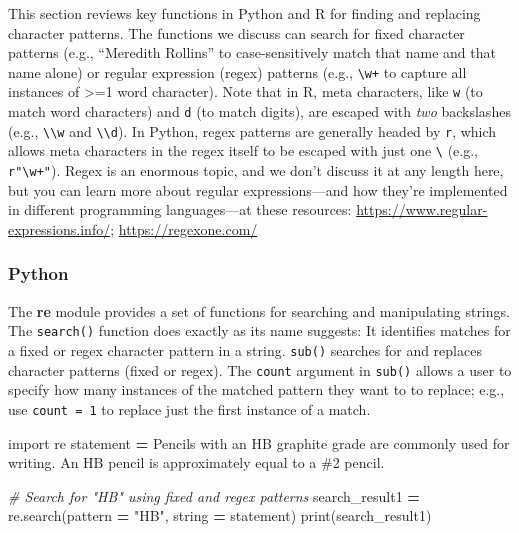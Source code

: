 \documentclass[
]{book}
\newenvironment{Shaded}{\begin{snugshade}}{\end{snugshade}}
\newcommand{\BuiltInTok}[1]{#1}
\newcommand{\CommentTok}[1]{\textcolor[rgb]{0.56,0.35,0.01}{\textit{#1}}}
\newcommand{\ImportTok}[1]{#1}
\newcommand{\NormalTok}[1]{#1}
\newcommand{\OperatorTok}[1]{\textcolor[rgb]{0.81,0.36,0.00}{\textbf{#1}}}
\newcommand{\StringTok}[1]{\textcolor[rgb]{0.31,0.60,0.02}{#1}}
\begin{document}
This section reviews key functions in Python and R for finding and replacing character patterns. The functions we discuss can search for fixed character patterns (e.g., ``Meredith Rollins'' to case-sensitively match that name and that name alone) or regular expression (regex) patterns (e.g., \texttt{\textbackslash{}w+} to capture all instances of \textgreater=1 word character). Note that in R, meta characters, like \texttt{w} (to match word characters) and \texttt{d} (to match digits), are escaped with \emph{two} backslashes (e.g., \texttt{\textbackslash{}\textbackslash{}w} and \texttt{\textbackslash{}\textbackslash{}d}). In Python, regex patterns are generally headed by \texttt{r}, which allows meta characters in the regex itself to be escaped with just one \texttt{\textbackslash{}} (e.g., \texttt{r"\textbackslash{}w+"}). Regex is an enormous topic, and we don't discuss it at any length here, but you can learn more about regular expressions---and how they're implemented in different programming languages---at these resources: \url{https://www.regular-expressions.info/}; \url{https://regexone.com/}

\hypertarget{python-25}{%
\subsubsection*{Python}\label{python-25}}

The \textbf{re} module provides a set of functions for searching and manipulating strings. The \texttt{search()} function does exactly as its name suggests: It identifies matches for a fixed or regex character pattern in a string. \texttt{sub()} searches for and replaces character patterns (fixed or regex). The \texttt{count} argument in \texttt{sub()} allows a user to specify how many instances of the matched pattern they want to to replace; e.g., use \texttt{count\ =\ 1} to replace just the first instance of a match.

\begin{Shaded}
\begin{Highlighting}[]
\ImportTok{import}\NormalTok{ re}
\NormalTok{statement }\OperatorTok{=} \StringTok{\textquotesingle{}Pencils with an HB graphite grade are commonly used for writing. An HB pencil is approximately equal to a \#2 pencil.\textquotesingle{}}

\CommentTok{\# Search for "HB" using fixed and regex patterns}
\NormalTok{search\_result1 }\OperatorTok{=}\NormalTok{ re.search(pattern }\OperatorTok{=} \StringTok{"HB"}\NormalTok{, string }\OperatorTok{=}\NormalTok{ statement)}
\BuiltInTok{print}\NormalTok{(search\_result1)}
\end{Highlighting}
\end{Shaded}
\end{document}
